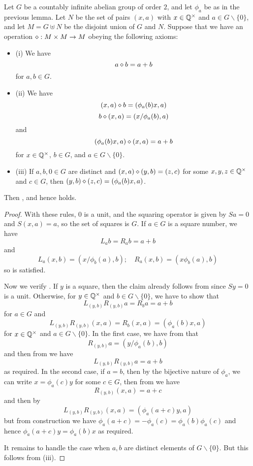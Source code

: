  \begin{lemma}\label{build-magma}  Let $G$ be a countably infinite abelian group of order $2$, and let $\phi_a$ be as in the previous lemma.  Let $N$ be the set of pairs $(x,a)$ with $x \in \mathbb{Q}^\times$ and $a \in G \backslash \{0\}$, and let $M = G \uplus N$ be the disjoint union of $G$ and $N$.  Suppose that we have an operation $\diamond : M \times M \to M$ obeying the following axioms:
\begin{itemize}
\item (i) We have
\begin{equation}\label{op-0}
  a \diamond b = a+b
\end{equation}
for $a,b \in G$.
\item (ii) We have
 \begin{equation}\label{op-1}
  (x,a) \diamond b = (\phi_a(b) x, a)
 \end{equation}
 \begin{equation}\label{op-2}
   b \diamond (x,a) = (x / \phi_a(b), a)
 \end{equation}
 and
 \begin{equation}\label{op-3}
   (\phi_a(b) x,a) \diamond (x,a) = a+b
 \end{equation}
 for $x \in \mathbb{Q}^\times$, $b \in G$, and $a \in G \backslash \{0\}$.
\item (iii) If $a,b,0 \in G$ are distinct and
$(x,a) \diamond (y,b) = (z,c)$ for some $x,y,z \in \mathbb{Q}^\times$ and $c \in G$, then $(y,b) \diamond (z,c) = (\phi_a(b) x,a)$.
\end{itemize}
Then ,  and hence  holds.
\end{lemma}

\begin{proof}
  With these rules, $0$ is a unit, and the squaring operator is given by $Sa = 0$ and $S(x,a) = a$, so the set of squares is $G$.  If $a \in G$ is a square number, we have
  $$ L_a b = R_a b = a+b$$
  and
  $$ L_a (x,b) = (x/\phi_b(a), b); \quad R_a (x,b) = (x \phi_b(a), b)$$
  so  is satisfied.

Now we verify .
If $y$ is a square, then the claim already follows from  since $Sy=0$ is a unit.  Otherwise, for $y \in \mathbb{Q}^\times$ and $b \in G \backslash \{0\}$, we have to show that
$$ L_{(y,b)} R_{(y,b)} a = R_b a = a+b$$
for $a \in G$ and
$$ L_{(y,b)} R_{(y,b)} (x,a) = R_b (x,a) = (\phi_a(b) x, a) $$
for $x \in \mathbb{Q}^\times$ and $a \in G \backslash \{0\}$.  In the first case, we have from  that
$$ R_{(y,b)} a = (y/\phi_a(b), b)$$
and then from  we have
$$L_{(y,b)} R_{(y,b)} a = a+b$$
as required.  In the second case, if $a=b$, then by the bijective nature of $\phi_a$, we can write $x = \phi_a(c) y$ for some $c \in G$, then from  we have
$$ R_{(y,b)} (x,a) = a+c$$
and then by 
$$ L_{(y,b)} R_{(y,b)} (x,a) = (\phi_a(a+c) y, a)$$
but from construction we have $\phi_a(a+c)=-\phi_a(c) = \phi_a(b)\phi_a(c)$ and hence $\phi_a(a+c) y = \phi_a(b) x$ as required.

It remains to handle the case when $a,b$ are distinct elements of $G \backslash \{0\}$.  But this follows from (iii).
\end{proof}

